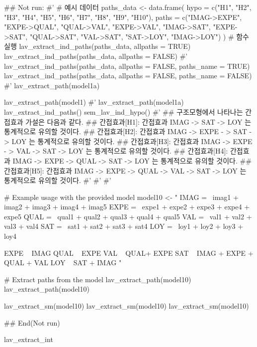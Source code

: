\documentclass[a4paper]{book}
\begin{document}
\begin{Examples}
\begin{ExampleCode}

## Not run: 
#'
# 예시 데이터
paths_data <- data.frame(
  hypo = c("H1", "H2", "H3", "H4", "H5",
  "H6", "H7", "H8", "H9", "H10"),
  paths = c("IMAG->EXPE", "EXPE->QUAL",
  "QUAL->VAL", "EXPE->VAL", "IMAG->SAT",
   "EXPE->SAT", "QUAL->SAT", "VAL->SAT", "SAT->LOY", "IMAG->LOY")
)
# 함수 실행
lav_extract_ind_paths(paths_data, allpaths = TRUE)
lav_extract_ind_paths(paths_data, allpaths = FALSE)
#'
lav_extract_ind_paths(paths_data, allpaths = FALSE, paths_name = TRUE)
lav_extract_ind_paths(paths_data, allpaths = FALSE, paths_name = FALSE)
#'
lav_extract_path(model1a)%

lav_extract_path(model1)%
#'
lav_extract_path(model1a) %
  lav_extract_ind_paths() %
  sem_lav_ind_hypo()
#'
## 구조모형에서 나타나는 간접효과 가설은 다음과 같다.
## 간접효과[H1]: 간접효과 IMAG -> SAT ->
LOY 는 통계적으로 유의할 것이다.
## 간접효과[H2]: 간접효과 IMAG -> EXPE -
> SAT -> LOY 는 통계적으로 유의할 것이다.
## 간접효과[H3]: 간접효과 IMAG -> EXPE -
> VAL -> SAT -> LOY 는 통계적으로 유의할 것이다.
## 간접효과[H4]: 간접효과 IMAG -> EXPE
-> QUAL -> SAT -> LOY 는 통계적으로 유의할 것이다.
## 간접효과[H5]: 간접효과 IMAG -> EXPE
-> QUAL -> VAL -> SAT -> LOY 는 통계적으로 유의할 것이다.
#' #'
#'

# Example usage with the provided model
model10 <- "
IMAG =~ imag1 + imag2 + imag3 + imag4 + imag5
EXPE =~ expe1 + expe2 + expe3 + expe4 + expe5
QUAL =~ qual1 + qual2 + qual3 + qual4 + qual5
VAL =~ val1 + val2 + val3 + val4
SAT =~ sat1 + sat2 + sat3 + sat4
LOY =~ loy1 + loy2 + loy3 + loy4

EXPE ~ IMAG
QUAL ~ EXPE
VAL ~  QUAL+ EXPE
SAT ~ IMAG + EXPE + QUAL + VAL
LOY ~ SAT + IMAG
"


# Extract paths from the model
lav_extract_path(model10)
lav_extract_path(model10)%

lav_extract_sm(model10)%
lav_extract_sm(model10)%
lav_extract_sm(model10)%


## End(Not run)

\end{ExampleCode}
\end{Examples}
%
\begin{Description}
lav\_extract\_int
\end{Description}
\end{document}
